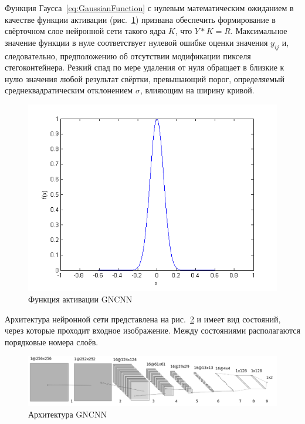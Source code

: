 Функция Гаусса~\eqref{eq:GaussianFunction} с нулевым математическим ожиданием в качестве функции активации (рис.~\ref{fig:GaussianFunction}) призвана обеспечить формирование в свёрточном слое нейронной сети такого ядра $ K $, что $ Y*K = R $. Максимальное значение функции в нуле соответствует нулевой ошибке оценки значения $ y_{ij} $ и, следовательно, предположению об отсутствии модификации пикселя стегоконтейнера. Резкий спад по мере удаления от нуля обращает в близкие к нулю значения любой результат свёртки, превышающий порог, определяемый среднеквадратическим отклонением $ \sigma $, влияющим на ширину кривой.

\begin{figure}
\centering
\includegraphics[width=1\textwidth]{include/graphics/gaussian_function}
\caption{Функция активации GNCNN}
\label{fig:GaussianFunction}
\end{figure}

Архитектура нейронной сети представлена на рис.~\ref{fig:GNCNNArchitecture} и имеет вид состояний, через которые проходит входное изображение. Между состояниями располагаются порядковые номера слоёв.

\begin{figure}
\centering
\includegraphics[width=1\textwidth]{include/graphics/gncnn_gray_architecture}
\caption{Архитектура GNCNN}
\label{fig:GNCNNArchitecture}
\end{figure}

